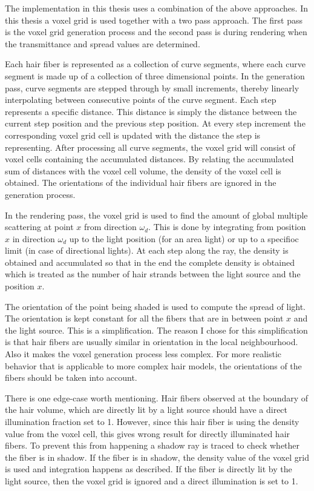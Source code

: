 \documentclass[11pt,a4paper]{report}
\begin{document}
The implementation in this thesis uses a combination of the above approaches. In this thesis a voxel grid is used together with a two pass approach. The first pass is the voxel grid generation process and the second pass is during rendering when the transmittance and spread values are determined. 

Each hair fiber is represented as a collection of curve segments, where each curve segment is made up of a collection of three dimensional points. In the generation pass, curve segments are stepped through by small increments, thereby linearly interpolating between consecutive points of the curve segment. Each step represents a specific distance. This distance is simply the distance between the current step position and the previous step position. At every step increment the corresponding voxel grid cell is updated with the distance the step is representing. After processing all curve segments, the voxel grid will consist of voxel cells containing the accumulated distances. By relating the accumulated sum of distances with the voxel cell volume, the density of the voxel cell is obtained. The orientations of the individual hair fibers are ignored in the generation process. 

In the rendering pass, the voxel grid is used to find the amount of global multiple scattering at point $x$ from direction $\omega_d$. This is done by integrating from position $x$ in direction $\omega_d$ up to the light position (for an area light) or up to a specifioc limit (in case of directional lights). At each step along the ray, the density is obtained and accumulated so that in the end the complete density is obtained which is treated as the number of hair strands between the light source and the position $x$.

The orientation of the point being shaded is used to compute the spread of light. The orientation is kept constant for all the fibers that are in between point $x$ and the light source. This is a simplification. The reason I chose for this simplification is that hair fibers are usually similar in orientation in the local neighbourhood. Also it makes the voxel generation process less complex. For more realistic behavior that is applicable to more complex hair models, the orientations of the fibers should be taken into account.

There is one edge-case worth mentioning. Hair fibers observed at the boundary of the hair volume, which are directly lit by a light source should have a direct illumination fraction set to 1. However, since this hair fiber is using the density value from the voxel cell, this gives wrong result for directly illuminated hair fibers. To prevent this from happening a shadow ray is traced to check whether the fiber is in shadow. If the fiber is in shadow, the density value of the voxel grid is used and integration happens as described. If the fiber is directly lit by the light source, then the voxel grid is ignored and a direct illumination is set to 1.
\end{document}
